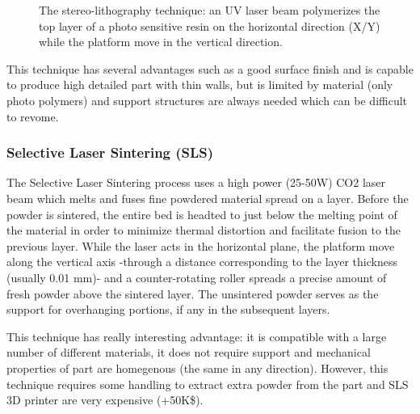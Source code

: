 \begin{figure}[h]
    \centering
        \hfil
        \hfil
    \caption{The stereo-lithography technique: an UV laser beam polymerizes the top layer of a photo sensitive resin on the horizontal direction (X/Y) while the platform move in the vertical direction.}
    \label{fig:SLA_technique}
\end{figure}

This technique has several advantages such as a good surface finish and is capable to produce high detailed part with thin walls, but is limited by material (only photo polymers) and support structures are always needed which can be difficult to revome.

\subsubsection{Selective Laser Sintering (SLS)} %
The Selective Laser Sintering process uses a high power (25-50W) CO2 laser beam which melts and fuses fine powdered material spread on a layer. Before the powder is sintered, the entire bed is headted to just below the melting point of the material in order to minimize thermal distortion and facilitate fusion to the previous layer.
While the laser acts in the horizontal plane, the platform move along the vertical axis -through a distance corresponding to the layer thickness (usually 0.01 mm)- and a counter-rotating roller spreads a precise amount of fresh powder above the sintered layer. The unsintered powder serves as the support for overhanging portions, if any in the subsequent layers.

\begin{figure}[h]
    \centering
        \hfil
        \hfil
    \caption{}
    \label{fig:SLS_technique}
\end{figure}

This technique has really interesting advantage: it is compatible with a large number of different materials, it does not require support and mechanical properties of part are homegenous (the same in any direction). However, this technique requires some handling to extract extra powder from the part and SLS 3D printer are very expensive (+50K\$).


